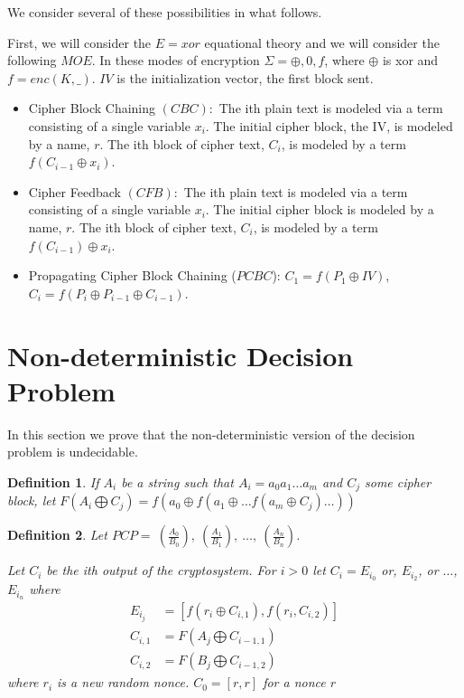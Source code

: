\documentclass[11pt,twoside,a4paper]{article}
\newtheorem{definition}{Definition}
\begin{document}
We consider several of these possibilities in what follows.

First, we will consider the $E=xor$ equational theory and we 
will consider the following $MOE$. In these modes of encryption 
$\Sigma ={\oplus, 0, f}$, where $\oplus$ is xor and $f=enc(K,\_)$.
$IV$ is the initialization vector, the first block sent. 
\begin{itemize}
	\item Cipher Block Chaining $(CBC):$ The ith plain text is modeled via a term consisting of a single variable $x_i$. The initial cipher block, the IV, is modeled by a name, $r$. The ith block of cipher text, $C_i$, is modeled by a
	term $f(C_{i-1} \oplus x_i)$.
	\item Cipher Feedback $(CFB):$ The ith plain text is modeled via a term consisting of a single variable $x_i$. The initial cipher block is modeled by a name, $r$. The ith block of cipher text, $C_i$, is modeled by a
	term $f(C_{i-1}) \oplus x_i$.  
	\item Propagating Cipher Block Chaining ($PCBC$): 
	$C_1 = f(P_1 \oplus IV)$, $C_i = f(P_i \oplus P_{i-1} \oplus C_{i-1})$.
\end{itemize}

\section{Non-deterministic Decision Problem}

In this section we prove that the non-deterministic version 
of the decision problem is undecidable.

\begin{definition}
If $A_i$ be a string such that $A_i = a_0 a_1\ldots a_m$ and 
$C_j$ some cipher block, let $F(A_i \bigoplus C_j) =
f(a_0 \oplus f(a_1 \oplus \ldots f(a_m \oplus C_j) \ldots ))$
\end{definition}

\begin{definition}\label{non-det-func}
Let $PCP = ~(\frac{A_0}{B_0}), ~(\frac{A_1}{B_1}), ~\ldots, ~(\frac{A_n}{B_n})$. 	
	
Let $C_i$ be the ith output of the cryptosystem. 
For $i > 0$ let $C_i = E_{i_0}$ or, $E_{i_2}$, or $\ldots$,
$E_{i_n}$ where 
\begin{align*}
	E_{i_j} &= [f(r_i \oplus C_{i, 1}), f(r_i, C_{i,2}) ] \\
	C_{i,1} &= F(A_j \bigoplus C_{i-1, 1})	\\
	C_{i,2} &= F(B_j \bigoplus C_{i-1, 2}) 
\end{align*}
where $r_i$ is a new random nonce.
$C_0 = [r,r]$ for a nonce $r$
\end{definition}
\end{document}
